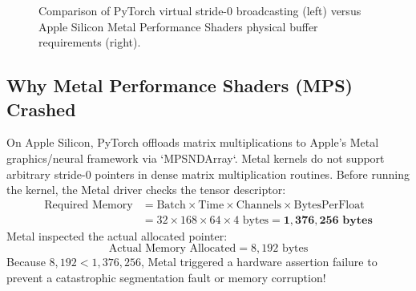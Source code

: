 \documentclass[11pt,a4paper]{article}
\begin{document}
\begin{figure}[htbp]
\centering
{}
\caption{Comparison of PyTorch virtual stride-0 broadcasting (left) versus Apple Silicon Metal Performance Shaders physical buffer requirements (right).}
\label{fig:mps_buffer}
\end{figure}

\subsection{Why Metal Performance Shaders (MPS) Crashed}
On Apple Silicon, PyTorch offloads matrix multiplications to Apple's Metal graphics/neural framework via `MPSNDArray`.
Metal kernels do not support arbitrary stride-0 pointers in dense matrix multiplication routines.
Before running the kernel, the Metal driver checks the tensor descriptor:
\begin{align}
    \text{Required Memory} &= \text{Batch} \times \text{Time} \times \text{Channels} \times \text{BytesPerFloat} \\
    &= 32 \times 168 \times 64 \times 4\text{ bytes} = \mathbf{1,376,256\text{ bytes}}
\end{align}
Metal inspected the actual allocated pointer:
\begin{equation}
    \text{Actual Memory Allocated} = 8,192\text{ bytes}
\end{equation}
Because $8,192 < 1,376,256$, Metal triggered a hardware assertion failure to prevent a catastrophic segmentation fault or memory corruption!
\end{document}
